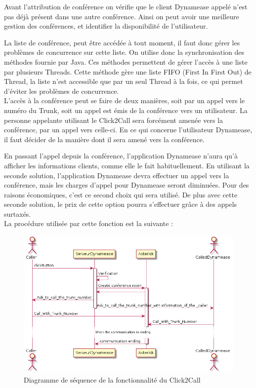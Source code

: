 Avant l'attribution de conférence on vérifie que le client Dynamease appelé n'est pas déjà présent dans une autre conférence. Ainsi on peut avoir une meilleure gestion des conférences, et identifier la disponibilité de l'utilisateur.

La liste de conférence, peut être accédée à tout moment, il faut donc gérer les problèmes de concurrence sur cette liste. On utilise donc la synchronisation des méthodes fournie par Java. Ces méthodes permettent de gérer l'accès à une liste par plusieurs Threads. Cette méthode gère une liste FIFO (First In First Out) de Thread, la liste n'est accessible que par un seul Thread à la fois, ce qui permet d'éviter les problèmes de concurrence.\\

L'accès à la conférence peut se faire de deux manières, soit par un appel vers le numéro du Trunk, soit un appel est émis de la conférence vers un utilisateur. La personne appelante utilisant le Click2Call sera forcément amenée vers la conférence, par un appel vers celle-ci. En ce qui concerne l'utilisateur Dynamease, il faut décider de la manière dont il sera amené vers la conférence.

En passant l'appel depuis la conférence, l'application Dynamease n'aura qu'à afficher les informations clients, comme elle le fait habituellement. En utilisant la seconde solution, l'application Dynamease devra effectuer un appel vers la conférence, mais les charges d'appel pour Dynamease seront diminuées. Pour des raisons économiques, c'est ce second choix qui sera utilisé. De plus avec cette seconde solution, le prix de cette option pourra s'effectuer grâce à des appels surtaxés.\\

La procédure utilisée par cette fonction est la suivante :

\begin{figure}[!h]
	\centering
	\includegraphics[scale=0.7]{img/sequence_click2call.png}
	\caption{\label{sequence_click2call} Diagramme de séquence de la fonctionnalité du Click2Call}
\end{figure}

